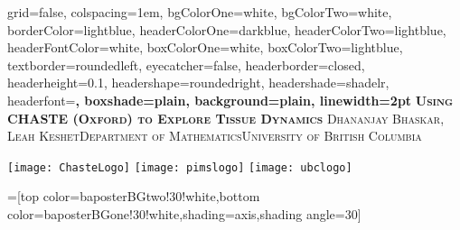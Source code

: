 \documentclass[a0paper,landscape,final]{baposter}
\begin{document}
\begin{poster}{
  grid=false,
  colspacing=1em,
  bgColorOne=white,
  bgColorTwo=white,
  borderColor=lightblue,
  headerColorOne=darkblue,
  headerColorTwo=lightblue,
  headerFontColor=white,
  boxColorOne=white,
  boxColorTwo=lightblue,
  textborder=roundedleft,
  eyecatcher=false,
  headerborder=closed,
  headerheight=0.1\textheight,
  headershape=roundedright,
  headershade=shadelr,
  headerfont=\Large\bf\textsc,
  boxshade=plain,
  background=plain,
  linewidth=2pt
  }
  {}
  {\bf\textsc{Using CHASTE (Oxford) to Explore Tissue Dynamics}}
  {\textsc{Dhananjay Bhaskar, Leah Keshet\hspace{2em}Department of Mathematics\hspace{2em}University of British Columbia}\vspace{0.2em}}
  {
  {\begin{minipage}{16em}
	\hfill
	\texttt{[image: ChasteLogo]}\hspace*{15pt}
	\texttt{[image: pimslogo]}\hspace*{15pt}
	\texttt{[image: ubclogo]}
  \end{minipage}}
  }

  =[top color=baposterBGtwo!30!white,bottom color=baposterBGone!30!white,shading=axis,shading angle=30]

  \newlength{\leftimgwidth}
  \setlength{\leftimgwidth}{0.78em+8.0em}


    
   
\newcommand{\colouredcircle}{
      \tikz{
      	\useasboundingbox (-0.2em,-0.32em) rectangle(0.2em,0.32em); 
      	\draw[draw=black,fill=lightblue,line width=0.03em] (0,0) circle(0.18em);
      }
}



\end{poster}
\end{document}
